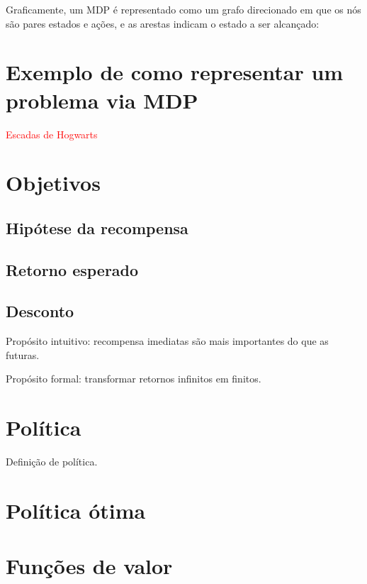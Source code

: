 \documentclass{article}
\begin{document}
        Graficamente, um MDP é representado como um grafo direcionado em que os nós são pares estados e ações, e as arestas indicam o estado a ser alcançado:
    
        \begin{center}
        \mdpbig
        \end{center}
        
    \section{Exemplo de como representar um problema via MDP}
    
        \textcolor{red}{Escadas de Hogwarts}
    
    \section{Objetivos}
    
        \subsection{Hipótese da recompensa}
    
        \subsection{Retorno esperado}
        
        \subsection{Desconto}
        
            Propósito intuitivo: recompensa imediatas são mais importantes do que as futuras.
            
            Propósito formal: transformar retornos infinitos em finitos.
        
    \section{Política}
    
        Definição de política.
    
        \section{Política ótima}
        
    
    \section{Funções de valor}
        
\end{document}
